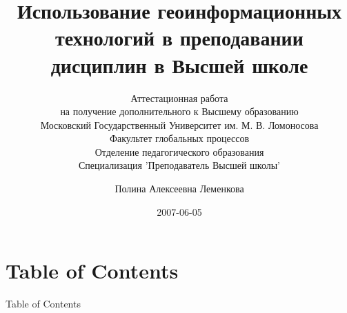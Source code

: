 \documentclass[pdflatex,compress,8pt,
	xcolor={dvipsnames,dvipsnames,svgnames,x11names,table},
	hyperref={	 
	pdfauthor={Lemenkova Polina}, 
	pdfsubject={Preentation}, 
	pdfcreator={Lemenkova Polina}, 
	pdfproducer={Lemenkova Polina}, 
	colorlinks=true,
	linkcolor=Red3, 
	citecolor=NavyBlue, 
	urlcolor = NavyBlue, 
	breaklinks = true}]{beamer}
\title[Using ArcGIS in Teaching Geosciences. Lomonosov Moscow State University, Moscow, Russia, 2007-06-05.]{Использование геоинформационных технологий в преподавании дисциплин в Высшей школе}
\subtitle{Аттестационная работа \\
на получение дополнительного к Высшему образованию\\
Московский Государственный Университет им. М. В. Ломоносова\\
Факультет глобальных процессов\\
Отделение педагогического образования\\
Специализация 'Преподаватель Высшей школы'
}
\author[Polina Lemenkova]{Полина Алексеевна Леменкова}
\date{2007-06-05}
\begin{document}
\begin{frame}
           \titlepage
\end{frame}

\section*{Table of Contents}
\begin{frame}{Table of Contents}
    \begin{columns}[onlytextwidth,T]
        \begin{column}{.30\textwidth}
            \footnotesize{\tableofcontents[sections=1-5]}
        \end{column}
        \begin{column}{.30\textwidth}
            \footnotesize{\tableofcontents[sections=6-6]}
        \end{column}
        \begin{column}{.30\textwidth}
            \footnotesize{\tableofcontents[sections=7-11]}
        \end{column}
    \end{columns}
\end{frame}
\end{document}
